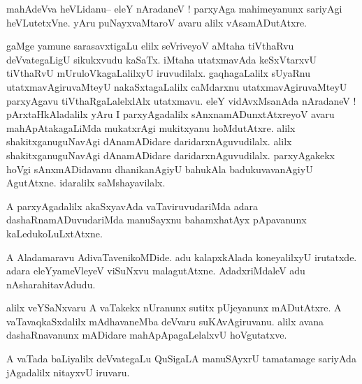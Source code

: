 \documentclass{article}
\begin{document}

\begin{mn}%
mahAdeVva heVLidanu-- eleY nAradaneV ! parxyAga mahimeyanunx sariyAgi heVLutetxVne. yAru 
puNayxvaMtaroV avaru alilx vAsamADutAtxre.
\end{mn}

\begin{mn}%
gaMge yamune sarasavxtigaLu elilx seVriveyoV aMtaha tiVthaRvu deVvategaLigU sikukxvudu 
kaSaTx. iMtaha utatxmavAda keSxVtarxvU tiVthaRvU mUruloVkagaLalilxyU iruvudilalx. 
gaqhagaLalilx sUyaRnu utatxmavAgiruvaMteyU nakaSxtagaLalilx caMdarxnu utatxmavAgiruvaMteyU 
parxyAgavu tiVthaRgaLalelxlAlx utatxmavu. eleY vidAvxMsanAda nAradaneV ! pArxtaHkAladalilx 
yAru I parxyAgadalilx sAnxnamADunxtAtxreyoV avaru mahApAtakagaLiMda mukatxrAgi mukitxyanu 
hoMdutAtxre. alilx shakitxganuguNavAgi dAnamADidare daridarxnAguvudilalx. alilx 
shakitxganuguNavAgi dAnamADidare daridarxnAguvudilalx. parxyAgakekx hoVgi sAnxmADidavanu 
dhanikanAgiyU bahukAla badukuvavanAgiyU AgutAtxne. idaralilx saMshayavilalx.
\end{mn}

\begin{mn}%
A parxyAgadalilx akaSxyavAda vaTaviruvudariMda adara dashaRnamADuvudariMda manuSayxnu 
bahamxhatAyx pApavanunx kaLedukoLuLxtAtxne.
\end{mn}

\begin{mn}%
A Aladamaravu AdivaTavenikoMDide. adu kalapxkAlada koneyalilxyU irutatxde. adara 
eleYyameVleyeV viSuNxvu malagutAtxne. AdadxriMdaleV adu nAsharahitavAdudu.
\end{mn}

\begin{mn}%
alilx veYSaNxvaru A vaTakekx nUranunx sutitx pUjeyanunx mADutAtxre. A vaTavaqkaSxdalilx 
mAdhavaneMba deVvaru suKAvAgiruvanu. alilx avana dashaRnavanunx mADidare mahApApagaLelalxvU 
hoVgutatxve.
\end{mn}

\begin{mn}%
A vaTada baLiyalilx deVvategaLu QuSigaLA manuSAyxrU tamatamage sariyAda jAgadalilx nitayxvU 
iruvaru.
\end{mn}
\end{document}
